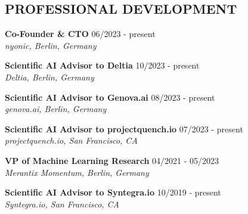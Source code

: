 \documentclass[10pt,centered]{./res} %
\begin{document}
\vspace*{-1.5cm}
\begin{resume}
\vspace{0.4cm}


\section{\color{ResumeBlue}PROFESSIONAL DEVELOPMENT}
{\bf Co-Founder \& CTO} \hfill06/2023 - present \\
{\it nyonic, Berlin, Germany}

{\bf Scientific AI Advisor to Deltia } \hfill10/2023 - present \\
{\it Deltia, Berlin, Germany}

{\bf Scientific AI Advisor to Genova.ai } \hfill08/2023 - present \\
{\it genova.ai, Berlin, Germany}

{\bf Scientific AI Advisor to projectquench.io } \hfill07/2023 - present \\
{\it projectquench.io, San Francisco, CA}

{\bf VP of Machine Learning Research} \hfill04/2021 - 05/2023 \\
{\it Merantix Momentum, Berlin, Germany}

{\bf Scientific AI Advisor to Syntegra.io } \hfill10/2019 - present \\
{\it Syntegra.io, San Francisco, CA}


\end{resume}
\end{document}
